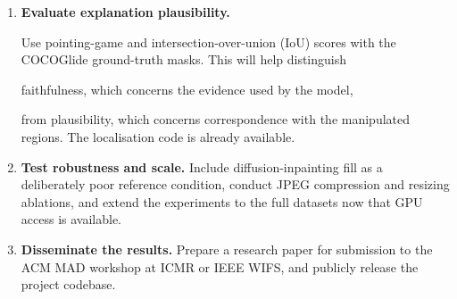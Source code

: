 \begin{enumerate}
    Investigate luminance-only replacement and patch-local spectral
    matching. For CLIP, test the semantic hypothesis by comparing

    transplants placed in context with those placed out of context.

    \item \textbf{Evaluate explanation plausibility.}

    Use pointing-game and intersection-over-union (IoU) scores with
    the COCOGlide ground-truth masks. This will help distinguish

    faithfulness, which concerns the evidence used by the model,

    from plausibility, which concerns correspondence with the
    manipulated regions. The localisation code is already available.

    \item \textbf{Test robustness and scale.}
    Include diffusion-inpainting fill as a deliberately poor
    reference condition, conduct JPEG compression and resizing
    ablations, and extend the experiments to the full datasets now
    that GPU access is available.

    \item \textbf{Disseminate the results.}
    Prepare a research paper for submission to the ACM MAD workshop
    at ICMR or IEEE WIFS, and publicly release the project codebase.
\end{enumerate}

